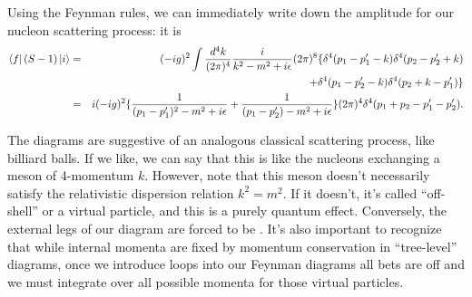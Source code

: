 Using the Feynman rules, we can immediately write down the amplitude for our nucleon scattering process: it is
\begin{eqnarray*}
\left< f \right|(S-1)\left| i \right>&=&(-ig)^2\int \frac{d^4k}{(2\pi)^4} \frac{i}{k^2-m^2+i\epsilon} (2\pi)^8 \{\delta^4(p_1-p_1' -k)\delta^4(p_2-p_2' +k)\\
&&+\delta^4(p_1-p_2'-k)\delta^4(p_2+k-p_1')\}\\
&=& i(-ig)^2 \{\frac{1}{(p_1-p_1')^2-m^2+i\epsilon}+\frac{1}{(p_1-p_2')-m^2+i\epsilon}\} (2\pi)^4 \delta^4(p_1+p_2-p_1' -p_2').
\end{eqnarray*}

The diagrams are suggestive of an analogous classical scattering process, like billiard balls. If we like, we can say that this is like the nucleons exchanging a meson of 4-momentum $k$. However, note that this meson doesn't necessarily satisfy the relativistic dispersion relation $k^2=m^2$. If it doesn't, it's called ``off-shell'' or a virtual particle, and this is a purely quantum effect. Conversely, the external legs of our diagram are forced to be . It's also important to recognize that while internal momenta are fixed by momentum conservation in ``tree-level'' diagrams, once we introduce loops into our Feynman diagrams all bets are off and we must integrate over all possible momenta for those virtual particles.